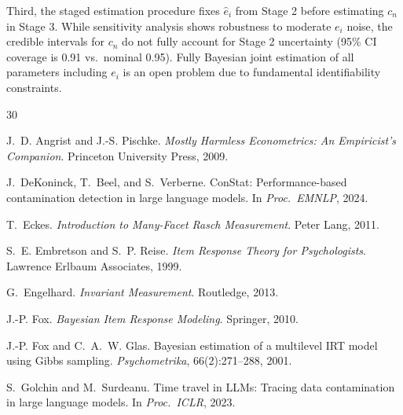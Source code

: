 \documentclass[11pt]{article}
\newcommand{\ei}{e_i}
\newcommand{\cn}{c_n}
\begin{document}
Third, the staged estimation procedure fixes $\hat{e}_i$ from Stage 2 before estimating $\cn$ in Stage 3. While sensitivity analysis shows robustness to moderate $\ei$ noise, the credible intervals for $\cn$ do not fully account for Stage 2 uncertainty (95\% CI coverage is 0.91 vs.\ nominal 0.95). Fully Bayesian joint estimation of all parameters including $\ei$ is an open problem due to fundamental identifiability constraints.



\begin{thebibliography}{30}

J.~D. Angrist and J.-S. Pischke.
\newblock \emph{Mostly Harmless Econometrics: An Empiricist's Companion}.
\newblock Princeton University Press, 2009.

J.~DeKoninck, T.~Beel, and S.~Verberne.
\newblock ConStat: Performance-based contamination detection in large language models.
\newblock In \emph{Proc.\ EMNLP}, 2024.

T.~Eckes.
\newblock \emph{Introduction to Many-Facet Rasch Measurement}.
\newblock Peter Lang, 2011.

S.~E. Embretson and S.~P. Reise.
\newblock \emph{Item Response Theory for Psychologists}.
\newblock Lawrence Erlbaum Associates, 1999.

G.~Engelhard.
\newblock \emph{Invariant Measurement}.
\newblock Routledge, 2013.

J.-P. Fox.
\newblock \emph{Bayesian Item Response Modeling}.
\newblock Springer, 2010.

J.-P. Fox and C.~A.~W. Glas.
\newblock Bayesian estimation of a multilevel IRT model using Gibbs sampling.
\newblock \emph{Psychometrika}, 66(2):271--288, 2001.

S.~Golchin and M.~Surdeanu.
\newblock Time travel in LLMs: Tracing data contamination in large language models.
\newblock In \emph{Proc.\ ICLR}, 2023.


\end{thebibliography}
\end{document}
